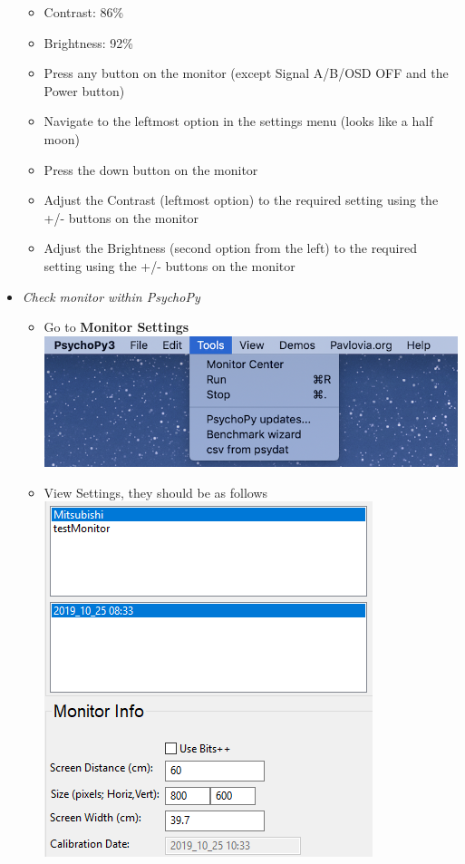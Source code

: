 \documentclass[]{article}
\providecommand{\tightlist}{%
  \setlength{\itemsep}{0pt}\setlength{\parskip}{0pt}}
\begin{document}
\begin{itemize}
  \begin{itemize}
  \item
    Contrast: 86\%\\
  \item
    Brightness: 92\%
  \item
    Press any button on the monitor (except Signal A/B/OSD OFF and the
    Power button)
  \item
    Navigate to the leftmost option in the settings menu (looks like a
    half moon)
  \item
    Press the down button on the monitor
  \item
    Adjust the Contrast (leftmost option) to the required setting using
    the +/- buttons on the monitor
  \item
    Adjust the Brightness (second option from the left) to the required
    setting using the +/- buttons on the monitor
  \end{itemize}
\item
  \emph{Check monitor within PsychoPy}

  \begin{itemize}
  \tightlist
  \item
    Go to \textbf{Monitor Settings}\\
    \includegraphics{images/pp2.png}\\
  \item
    View Settings, they should be as follows\\
    \includegraphics{images/pp3.PNG}
  \end{itemize}
\end{itemize}
\end{document}
